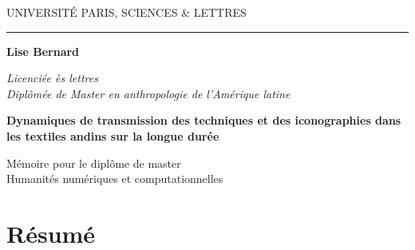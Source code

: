 \documentclass[a4paper, twoside]{book}
\begin{document}
\frontmatter

\begin{titlepage}
\begin{center}

\bigskip

\begin{large}
UNIVERSITÉ PARIS, SCIENCES \& LETTRES
\end{large}
\begin{center}\rule{2cm}{0.02cm}\end{center}

\bigskip
\bigskip
\bigskip

\begin{Large}
\textbf{Lise Bernard}\\
\end{Large}
\begin{normalsize} \textit{Licenciée ès lettres}\\
\textit{Diplômée de Master en anthropologie de l'Amérique latine}\\
\end{normalsize}

\bigskip
\bigskip
\bigskip

\begin{Huge}
\textbf{Dynamiques de transmission des techniques et des iconographies dans les textiles andins sur la longue durée}\\
\end{Huge}
\bigskip
\bigskip
\bigskip

\bigskip
\bigskip
\bigskip
\begin{large}
\end{large}
\vfill

\begin{large}
Mémoire 
pour le diplôme de master \\
\og Humanités numériques et computationnelles \fg{} \\
\end{large}

\end{center}
\end{titlepage}

\thispagestyle{empty}

\cleardoublepage

\section*{Résumé}

\vspace{5pt}
\end{document}
